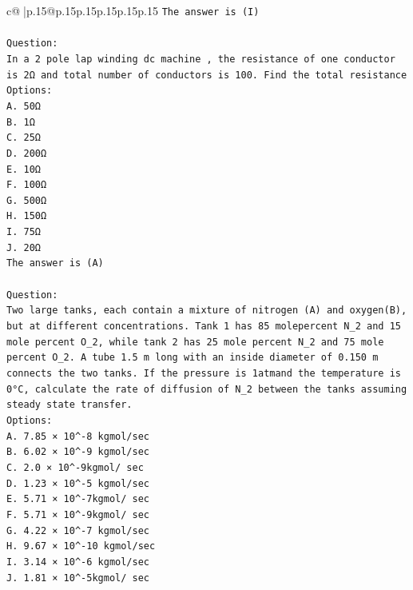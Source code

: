 \documentclass{article}
\begin{document}
{\begin{supertabular}{c@{$\;$}|p{.15\linewidth}@{}p{.15\linewidth}p{.15\linewidth}p{.15\linewidth}p{.15\linewidth}p{.15\linewidth}}
{{{\texttt{The answer is (I)} \\
\\ 
\texttt{Question:} \\
\texttt{In a 2 pole lap winding dc machine , the resistance of one conductor is 2Ω and total number of conductors is 100. Find the total resistance} \\
\texttt{Options:} \\
\texttt{A. 50Ω} \\
\texttt{B. 1Ω} \\
\texttt{C. 25Ω} \\
\texttt{D. 200Ω} \\
\texttt{E. 10Ω} \\
\texttt{F. 100Ω} \\
\texttt{G. 500Ω} \\
\texttt{H. 150Ω} \\
\texttt{I. 75Ω} \\
\texttt{J. 20Ω} \\
\texttt{The answer is (A)} \\
\\ 
\texttt{Question:} \\
\texttt{Two large tanks, each contain a mixture of nitrogen (A) and oxygen(B), but at different concentrations. Tank 1 has 85 molepercent N\_2 and 15 mole percent O\_2, while tank 2 has 25 mole percent N\_2 and 75 mole percent O\_2. A tube 1.5 m long with an inside diameter of 0.150 m connects the two tanks. If the pressure is 1atmand the temperature is 0°C, calculate the rate of diffusion of N\_2 between the tanks assuming steady state transfer.} \\
\texttt{Options:} \\
\texttt{A. 7.85 × 10\^{}{-}8 kgmol/sec} \\
\texttt{B. 6.02 × 10\^{}{-}9 kgmol/sec} \\
\texttt{C. 2.0 × 10\^{}{-}9kgmol/ sec} \\
\texttt{D. 1.23 × 10\^{}{-}5 kgmol/sec} \\
\texttt{E. 5.71 × 10\^{}{-}7kgmol/ sec} \\
\texttt{F. 5.71 × 10\^{}{-}9kgmol/ sec} \\
\texttt{G. 4.22 × 10\^{}{-}7 kgmol/sec} \\
\texttt{H. 9.67 × 10\^{}{-}10 kgmol/sec} \\
\texttt{I. 3.14 × 10\^{}{-}6 kgmol/sec} \\
\texttt{J. 1.81 × 10\^{}{-}5kgmol/ sec} \\
            }
        }
    }
     \\ \\


\end{supertabular}}
\end{document}
